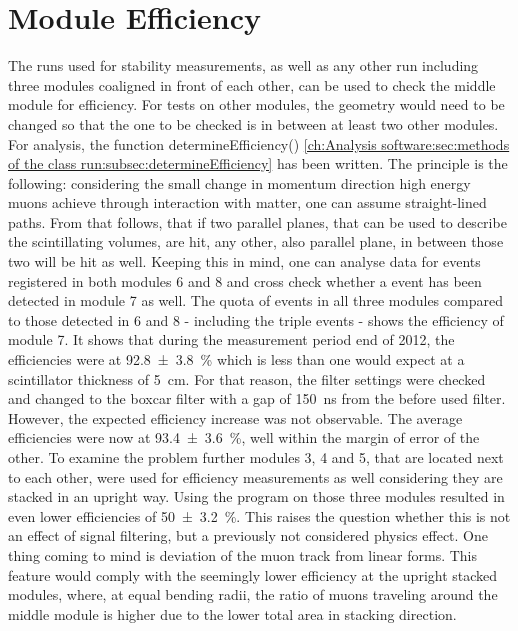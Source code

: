   \section{Module Efficiency}
  \label{ch:Analysis:sec:Module Efficiency}
  The runs used for stability measurements, as well as any other run including three modules coaligned in front of each other, can be used to check the middle module for efficiency. For tests on other modules, the geometry would need to be changed so that the one to be checked is in between at least two other modules.
  For analysis, the function determineEfficiency() \ref{ch:Analysis software:sec:methods of the class run:subsec:determineEfficiency}
  has been written.
  The principle is the following: considering the small change in momentum direction high energy muons achieve through interaction with matter, one can assume straight-lined paths. From that follows, that if two parallel planes, that can be used to describe the scintillating volumes, are hit, any other, also parallel plane, in between those two will be hit as well. Keeping this in mind, one can analyse data for events registered in both modules 6 and 8 and cross check whether a event has been detected in module 7 as well. The quota of events in all three modules compared to those detected in 6 and 8 -  including the triple events - shows the efficiency of module 7.
  It shows that during the measurement period end of 2012, the efficiencies were at  \SI{92.8\pm 3.8 }{\percent} which is less than one would expect at a scintillator thickness of \SI{5}{\centi\meter}.
  For that reason, the filter settings were checked and changed to the boxcar filter with a gap of \SI{150}{\ns} from the before used  filter. However, the expected efficiency increase was not observable. The average efficiencies were now at \SI{93.4 \pm 3.6}{\percent}, well within the margin of error of the other.
  To examine the problem further modules 3, 4 and 5, that are located next to each other, were used for efficiency measurements as well considering they are stacked in an upright way. Using the program on those three modules resulted in even lower efficiencies of \SI{50\pm 3.2}{\percent}. This raises the question whether this is not an effect of signal filtering, but a previously not considered physics effect. One thing coming to mind is deviation of the muon track from linear forms. This feature would comply with the seemingly lower efficiency at the upright stacked modules, where, at equal bending radii, the ratio of muons traveling around the middle module is higher due to the lower total area in stacking direction.
